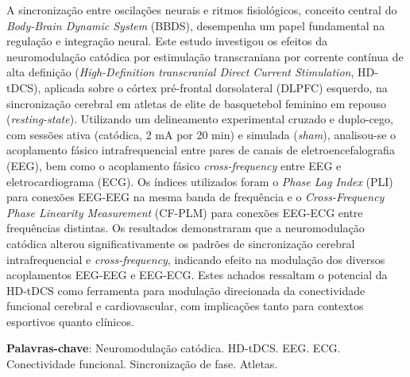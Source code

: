 
\setlength{\absparsep}{18pt} %
\begin{resumo}
A sincronização entre oscilações neurais e ritmos fisiológicos, conceito central do \textit{Body-Brain Dynamic System} (BBDS), desempenha um papel fundamental na regulação e integração neural. Este estudo investigou os efeitos da neuromodulação catódica por estimulação transcraniana por corrente contínua de alta definição (\textit{High-Definition transcranial Direct Current Stimulation}, HD-tDCS), aplicada sobre o córtex pré-frontal dorsolateral (DLPFC) esquerdo, na sincronização cerebral em atletas de elite de basquetebol feminino em repouso (\textit{resting-state}). Utilizando um delineamento experimental cruzado e duplo-cego, com sessões ativa (catódica, 2 mA por 20 min) e simulada (\textit{sham}), analisou-se o acoplamento fásico intrafrequencial entre pares de canais de eletroencefalografia (EEG), bem como o acoplamento fásico \textit{cross-frequency} entre EEG e eletrocardiograma (ECG). Os índices utilizados foram o \textit{Phase Lag Index} (PLI) para conexões EEG-EEG na mesma banda de frequência e o \textit{Cross-Frequency Phase Linearity Measurement} (CF-PLM) para conexões EEG-ECG entre frequências distintas. Os resultados demonstraram que a neuromodulação catódica alterou significativamente os padrões de sincronização cerebral intrafrequencial e \textit{cross-frequency}, indicando efeito na modulação dos diversos acoplamentos EEG-EEG e EEG-ECG. Estes achados ressaltam o potencial da HD-tDCS como ferramenta para modulação direcionada da conectividade funcional cerebral e cardiovascular, com implicações tanto para contextos esportivos quanto clínicos.

\textbf{Palavras-chave}: Neuromodulação catódica. HD-tDCS. EEG. ECG. Conectividade funcional. Sincronização de fase. Atletas.

\end{resumo}


